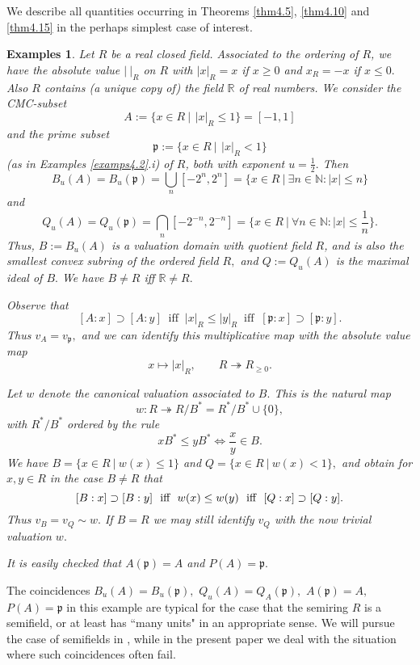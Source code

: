 \documentclass [12pt,a4paper,reqno]{amsart}
\newtheorem{examples}[thm]{Examples}
\begin{document}
We describe all quantities occurring in Theorems \ref{thm4.5},
\ref{thm4.10} and \ref{thm4.15} in the perhaps simplest case of
interest.

\begin{examples}\label{examps4.16}
 Let $R$ be a real closed field. Associated to the
ordering of $R$, we have the absolute value $|\ |_R$ on $R$ with
$|x|_R=x$ if $x\ge0$ and $x _R=-x$ if $x\le 0.$ Also $R$ contains
(a unique copy of) the field $\mathbb R$ of real numbers. We
consider the CMC-subset
$$A:=\{x\in R {\ {|} \ } \,  |x|_R\le 1\}=[-1,1]$$
and the prime subset
$${\mathfrak p}:=\{x\in R {\ {|} \ }\, |x|_R<1\}$$
(as in Examples \ref{examps4.2}.i) of $R$, both with exponent
$u=\frac{1}{2}.$ Then
$$B_u(A)=B_u({\mathfrak p})=\bigcup_n[-2^n,2^n] = \{x\in R {\ {|} \ }\exists
n\in\mathbb N:|x|\le n\}$$ and $$Q_u(A)=Q_u({\mathfrak p})=\bigcap
_n[-2^{-n},2^{-n}]=\Big\{x\in R {\ {|} \ }\forall n\in \mathbb
N:|x|\le\frac{1}{n}\Big\}.$$ Thus, $B:=B_u(A)$ is a valuation
domain with quotient field $R$, and is also the smallest convex
subring of the ordered field $R,$ and $Q:=Q_u(A)$ is the maximal
ideal of $B.$ We have $B\ne R$ iff $\mathbb R\ne R.$

Observe that $$[A:x]\supset [A:y] \ \text{ iff } \ |x|_R\le |y|_R
\ \text{ iff } \ [{\mathfrak p}:x]\supset[{\mathfrak p}:y].$$ Thus $v_A=v_{\mathfrak p},$
and we can identify this multiplicative map with the absolute
value map $$ x \mapsto |x|_R, \qquad R\twoheadrightarrow
R_{\ge0}.$$

Let $w$ denote the canonical valuation associated to $B.$ This is
the natural map
$$w: R\twoheadrightarrow R/B^*=R^*/B^*\cup\{0\},$$
with $R^*/B^*$ ordered by the rule
$$xB^*\le  y B^*\Leftrightarrow \frac{x}{y}\in B.$$
We have $B=\{x\in R {\ {|} \ }w(x)\le 1\}$ and $Q=\{x\in R {\ {|} \ }w(x)<1\},$ and obtain for $x,y\in R$ in the case $B\ne R$ that
$$\text{$[B:x]\supset [B:y]$ \ iff \  $w(x)\le w(y)$ \ iff \
$[Q:x]\supset[Q:y].$}$$ Thus $v_B=v_Q\sim w.$ If $B=R$ we may
still identify $v_Q$ with the now trivial valuation $w.$

It is easily checked that $A({\mathfrak p})=A$ and
$P(A)={\mathfrak p}.$\end{examples}

 The coincidences $B_u(A)=B_u({\mathfrak p}),$ $Q_u(A)=Q_A({\mathfrak p}),$ $A({\mathfrak p})=A,$ $P(A)={\mathfrak p}$ in this example are
 typical for the case that the semiring $R$ is a semifield, or at
 least has ``many units" in an appropriate sense. We will pursue
 the case of semifields in \cite{IKR3}, while in the present paper
 we deal with the situation where such coincidences
 often fail.
\end{document}
